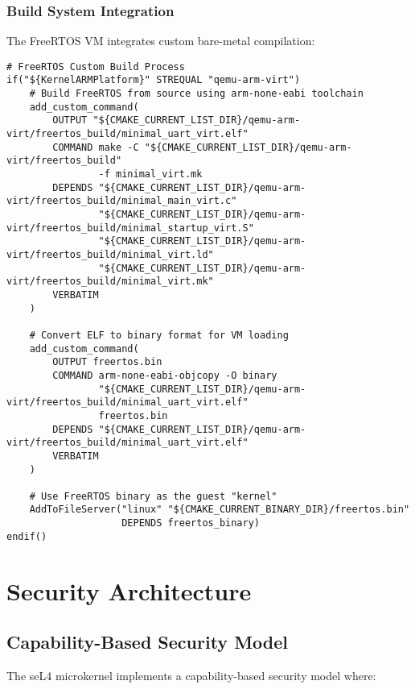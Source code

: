 \documentclass[12pt,a4paper]{article}
\begin{document}
\subsubsection{Build System Integration}
The FreeRTOS VM integrates custom bare-metal compilation:


\begin{lstlisting}[style=bash]
# FreeRTOS Custom Build Process
if("${KernelARMPlatform}" STREQUAL "qemu-arm-virt")
    # Build FreeRTOS from source using arm-none-eabi toolchain
    add_custom_command(
        OUTPUT "${CMAKE_CURRENT_LIST_DIR}/qemu-arm-virt/freertos_build/minimal_uart_virt.elf"
        COMMAND make -C "${CMAKE_CURRENT_LIST_DIR}/qemu-arm-virt/freertos_build" 
                -f minimal_virt.mk
        DEPENDS "${CMAKE_CURRENT_LIST_DIR}/qemu-arm-virt/freertos_build/minimal_main_virt.c"
                "${CMAKE_CURRENT_LIST_DIR}/qemu-arm-virt/freertos_build/minimal_startup_virt.S"
                "${CMAKE_CURRENT_LIST_DIR}/qemu-arm-virt/freertos_build/minimal_virt.ld"
                "${CMAKE_CURRENT_LIST_DIR}/qemu-arm-virt/freertos_build/minimal_virt.mk"
        VERBATIM
    )
    
    # Convert ELF to binary format for VM loading
    add_custom_command(
        OUTPUT freertos.bin
        COMMAND arm-none-eabi-objcopy -O binary 
                "${CMAKE_CURRENT_LIST_DIR}/qemu-arm-virt/freertos_build/minimal_uart_virt.elf" 
                freertos.bin
        DEPENDS "${CMAKE_CURRENT_LIST_DIR}/qemu-arm-virt/freertos_build/minimal_uart_virt.elf"
        VERBATIM
    )
    
    # Use FreeRTOS binary as the guest "kernel"
    AddToFileServer("linux" "${CMAKE_CURRENT_BINARY_DIR}/freertos.bin" 
                    DEPENDS freertos_binary)
endif()
\end{lstlisting}

\section{Security Architecture}

\subsection{Capability-Based Security Model}

The seL4 microkernel implements a capability-based security model where:
\end{document}
